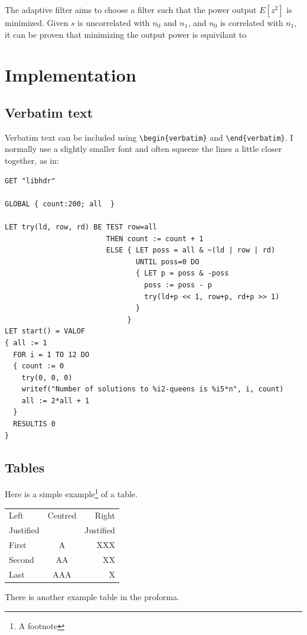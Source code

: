\documentclass[12pt,a4paper,twoside,openright]{report}
\renewcommand{\baselinestretch}{1.1}    %
\begin{document}
The adaptive filter aims to choose a filter such that the power output 
\(E[z^2]\) is minimized. Given \(s\) is uncorrelated with \(n_0\) and \(n_1\), and \(n_0\)
is correlated with \(n_1\), it can be proven that minimizing the output
power is equivilant to 

\chapter{Implementation}

\section{Verbatim text}

Verbatim text can be included using \verb|\begin{verbatim}| and
\verb|\end{verbatim}|. I normally use a slightly smaller font and
often squeeze the lines a little closer together, as in:

{\renewcommand{\baselinestretch}{0.8}\small
\begin{verbatim}
GET "libhdr"
 
GLOBAL { count:200; all  }
 
LET try(ld, row, rd) BE TEST row=all
                        THEN count := count + 1
                        ELSE { LET poss = all & ~(ld | row | rd)
                               UNTIL poss=0 DO
                               { LET p = poss & -poss
                                 poss := poss - p
                                 try(ld+p << 1, row+p, rd+p >> 1)
                               }
                             }
LET start() = VALOF
{ all := 1
  FOR i = 1 TO 12 DO
  { count := 0
    try(0, 0, 0)
    writef("Number of solutions to %i2-queens is %i5*n", i, count)
    all := 2*all + 1
  }
  RESULTIS 0
}
\end{verbatim}
}

\section{Tables}

\begin{samepage}
Here is a simple example\footnote{A footnote} of a table.

\begin{center}
\begin{tabular}{l|c|r}
Left      & Centred & Right \\
Justified &         & Justified \\[3mm]
First     & A       & XXX \\
Second    & AA      & XX  \\
Last      & AAA     & X   \\
\end{tabular}
\end{center}

\noindent
There is another example table in the proforma.
\end{samepage}
\end{document}
